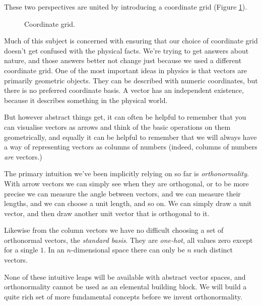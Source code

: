 These two perspectives are united by introducing a coordinate grid (Figure \ref{fig:vector-coordinate-grid}).

\begin{figure}[h]
    \centering
    \caption{Coordinate grid.} \label{fig:vector-coordinate-grid}
\end{figure}

Much of this subject is concerned with ensuring that our choice of coordinate grid doesn't get confused with the physical facts. We're trying to get answers about nature, and those answers better not change just because we used a different coordinate grid. One of the most important ideas in physics is that vectors are primarily geometric objects. They can be described with numeric coordinates, but there is no preferred coordinate basis. A vector has an independent existence, because it describes something in the physical world.

But however abstract things get, it can often be helpful to remember that you can visualise vectors as arrows and think of the basic operations on them geometrically, and equally it can be helpful to remember that we will always have a way of representing vectors as columns of numbers (indeed, columns of numbers \textit{are} vectors.)

The primary intuition we've been implicitly relying on so far is \textit{orthonormality}. With arrow vectors we can simply see when they are orthogonal, or to be more precise we can measure the angle between vectors, and we can measure their lengths, and we can choose a unit length, and so on. We can simply draw a unit vector, and then draw another unit vector that is orthogonal to it.

Likewise from the column vectors we have no difficult choosing a set of orthonormal vectors, the \textit{standard basis}. They are \textit{one-hot}, all values zero except for a single $1$. In an $n$-dimensional space there can only be $n$ such distinct vectors.

None of these intuitive leaps will be available with abstract vector spaces, and orthonormality cannot be used as an elemental building block. We will build a quite rich set of more fundamental concepts before we invent orthonormality.

